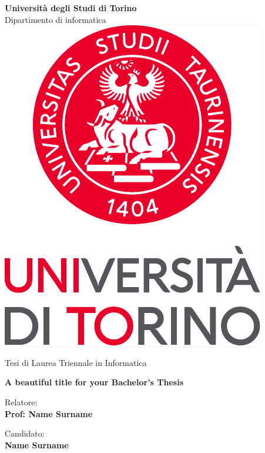 \begin{titlepage}

\begin{center}
    \textbf{\huge{Università degli Studi di Torino}}
    \vspace{2mm}
    \\ \LARGE{Dipartimento di informatica}
    \vspace{5mm}
    \\ \includegraphics[keepaspectratio=true,scale=0.8]{images/unito_logo.pdf}
    \vspace{5mm}
\end{center}

\begin{center}
    \LARGE{Tesi di Laurea Triennale in Informatica} 
\end{center}

\vspace{15mm}
\begin{center}
    \textbf{\huge{ A beautiful title for your Bachelor's Thesis }}
\end{center}
\vspace{30mm}

\begin{minipage}[t]{0.47\textwidth}
	{\large{Relatore:}{\normalsize\vspace{3mm}
	\bf\\ \large{Prof: Name Surname} \normalsize\vspace{3mm}\bf}}
\end{minipage}
\hfill
\begin{minipage}[t]{0.47\textwidth}\raggedleft
	{\large{Candidato:}{\normalsize\vspace{3mm} \bf\\ \large{Name Surname}}}
\end{minipage}

\vspace{40 mm}
\hrulefill
\\ 

\end{titlepage}